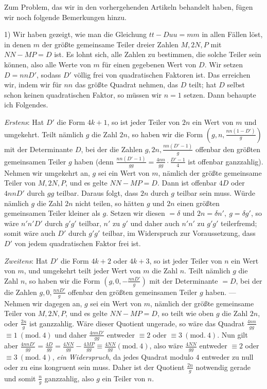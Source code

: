 Zum Problem, das wir in den vorhergehenden Artikeln behandelt haben, fügen wir noch folgende Bemerkungen hinzu.

1) Wir haben gezeigt, wie man die Gleichung \(tt-Duu=mm\) in allen Fällen löst, in denen \(m\) der größte gemeinsame Teiler dreier Zahlen \(M,2N,P\) mit \(NN-MP=D\) ist. Es lohnt sich, alle Zahlen zu bestimmen, die solche Teiler sein können, also alle Werte von \(m\) für einen gegebenen Wert von \(D\). Wir setzen \(D=nnD'\), sodass \(D'\) völlig frei von quadratischen Faktoren ist. Das erreichen wir, indem wir für \(nn\) das größte Quadrat nehmen, das \(D\) teilt; hat \(D\) selbst schon keinen quadratischen Faktor, so müssen wir \(n=1\) setzen. Dann behaupte ich Folgendes.

\textit{Erstens}: Hat \(D'\) die Form \(4k+1\), so ist jeder Teiler von \(2n\) ein Wert von \(m\) und umgekehrt. Teilt nämlich \(g\) die Zahl \(2n\), so haben wir die Form \(\left(g,n,\frac{nn(1-D')}{g}\right)\) mit der Determinante \(D\), bei der die Zahlen \(g,2n,\frac{nn(D'-1)}{g}\) offenbar den größten gemeinsamen Teiler \(g\) haben (denn \(\frac{nn(D'-1)}{gg}=\frac{4nn}{gg}\cdot\frac{D'-1}{4}\) ist offenbar ganzzahlig). Nehmen wir umgekehrt an, \(g\) sei ein Wert von \(m\), nämlich der größte gemeinsame Teiler von \(M,2N,P\), und es gelte \(NN-MP=D\). Dann ist offenbar \(4D\) oder \(4nnD'\) durch \(gg\) teilbar. Daraus folgt, dass \(2n\) durch \(g\) teilbar sein muss. Würde nämlich \(g\) die Zahl \(2n\) nicht teilen, so hätten \(g\) und \(2n\) einen größten gemeinsamen Teiler kleiner als \(g\). Setzen wir diesen \(=\delta\) und
\(2n=\delta n',\ g=\delta g'\), so wäre \(n'n'D'\) durch \(g'g'\) teilbar, \(n'\) zu \(g'\) und daher auch \(n'n'\) zu \(g'g'\) teilerfremd; somit wäre auch \(D'\) durch \(g'g'\) teilbar, im Widerspruch zur Voraussetzung, dass \(D'\) von jedem quadratischen Faktor frei ist.

\textit{Zweitens}: Hat \(D'\) die Form \(4k+2\) oder \(4k+3\), so ist jeder Teiler von \(n\) ein Wert von \(m\), und umgekehrt teilt jeder Wert von \(m\) die Zahl \(n\). Teilt nämlich \(g\) die Zahl \(n\), so haben wir die Form \(\left(g,0,-\frac{nnD'}{g}\right)\) mit der Determinante \(=D\), bei der die Zahlen \(g,0,\frac{nnD'}{g}\) offenbar den größten gemeinsamen Teiler \(g\) haben. --- Nehmen wir dagegen an, \(g\) sei ein Wert von \(m\), nämlich der größte gemeinsame Teiler von \(M,2N,P\), und es gelte \(NN-MP=D\), so teilt wie oben \(g\) die Zahl \(2n\), oder \(\frac{2n}{g}\) ist ganzzahlig. Wäre dieser Quotient ungerade, so wäre das Quadrat \(\frac{4nn}{gg}\) \(\equiv1\ (\mathrm{mod.}\ 4)\) und daher \(\frac{4nnD'}{gg}\) entweder \(\equiv2\) oder \(\equiv3\ (\mathrm{mod.}\ 4)\). Nun gilt aber \(\frac{4nnD'}{gg}=\frac{4D}{gg}=\frac{4NN}{gg}-\frac{4MP}{gg}\equiv\frac{4NN}{gg}(\mathrm{mod.}\ 4)\), also wäre \(\frac{4NN}{gg}\) entweder \(\equiv2\) oder \(\equiv3\ (\mathrm{mod.}\ 4)\), \textit{ein Widerspruch}, da jedes Quadrat modulo \(4\) entweder zu null oder zu eins kongruent sein muss. Daher ist der Quotient \(\frac{2n}{g}\) notwendig gerade und somit \(\frac{n}{g}\) ganzzahlig, also \(g\) ein Teiler von \(n\).

